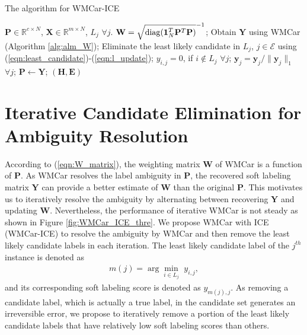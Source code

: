 \documentclass[10pt,journal,compsoc]{IEEEtran}
\begin{document}
\begin{algorithm}[htp!]
  \caption{The algorithm for WMCar-ICE}
  \begin{algorithmic}[1]
    \Require
     $\mathbf{P} \in \mathbb{R}^{c \times N}$, $\mathbf{X} \in \mathbb{R}^{m \times N}$, $L_j \,\, \forall j$.
      \State $\mathbf{W} = \sqrt{\mathop{\rm diag}\nolimits(\mathbf{1}_N^T \mathbf{P}^T \mathbf{P})}^{-1} $;
      \State Obtain $\mathbf{Y}$ using WMCar (Algorithm \ref{alg:alm_W});
      \State Eliminate the least likely candidate in $L_j$, $j \in \mathcal{E}$ using (\ref{eqn:least_candidate})-(\ref{eqn:l_update});
      \State $y_{i,j} = 0$, if $ i \notin L_j$ $\forall j$;\label{line:iwmcar_p1}
      \State $\mathbf{y}_j = \mathbf{y}_j / \|\mathbf{y}_j\|_1$ $\forall j$;\label{line:iwmcar_p2}
      \State $\mathbf{P} \leftarrow \mathbf{Y}$;
    \EndWhile
    \Ensure
        $(\mathbf{H}, \mathbf{E})$
  \end{algorithmic}\label{alg:iwmcar}
\end{algorithm}

\section{Iterative Candidate Elimination for Ambiguity Resolution} \label{sec:ice}
According to (\ref{eqn:W_matrix}), the weighting matrix $\mathbf{W}$ of WMCar is a function of $\mathbf{P}$.
As WMCar resolves the label ambiguity in $\mathbf{P}$, the recovered soft labeling matrix $\mathbf{Y}$ can provide a better estimate of $\mathbf{W}$ than the original $\mathbf{P}$.
This motivates us to iteratively resolve the ambiguity by alternating between recovering $\mathbf{Y}$ and updating $\mathbf{W}$. Nevertheless, the performance of iterative WMCar is not steady as shown in Figure \ref{fig:WMCar_ICE_thre}. We propose WMCar with ICE (WMCar-ICE) to resolve the ambiguity by WMCar and then remove the least likely candidate labels in each iteration. The least likely candidate label of the $j^{th}$ instance is denoted as
\begin{align}
m(j)= \arg\!\min_{i \in L_j} \,\, y_{i,j}, \label{eqn:least_candidate}
\end{align}
and its corresponding soft labeling score is denoted as $y_{m(j),j}$.
As removing a candidate label, which is actually a true label, in the candidate set generates an irreversible error, we propose to iteratively remove a portion of the least likely candidate labels that have relatively low soft labeling scores than others.
\end{document}
